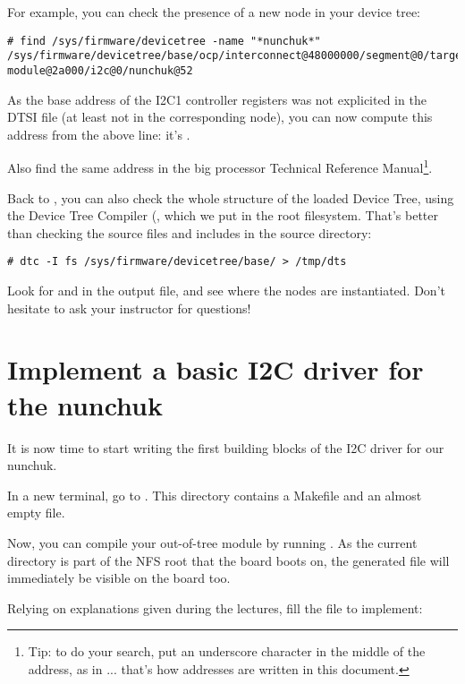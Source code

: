 For example, you can check the presence of a new  node in
your device tree:

{\small
\begin{verbatim}
# find /sys/firmware/devicetree -name "*nunchuk*"
/sys/firmware/devicetree/base/ocp/interconnect@48000000/segment@0/target-module@2a000/i2c@0/nunchuk@52
\end{verbatim}
}

As the base address of the I2C1 controller registers was not explicited
in the DTSI file (at least not in the corresponding node), you can now
compute this address from the above line: it's .

Also find the same address in the big processor Technical Reference
Manual\footnote{Tip: to do your search, put an underscore character
in the middle of the address, as in ... that's how
addresses are written in this document.}.

Back to , you can also check the whole
structure of the loaded Device Tree, using the Device Tree Compiler
(, which we put in the root filesystem. That's better than
checking the source files and includes in the source directory:

\begin{verbatim}
# dtc -I fs /sys/firmware/devicetree/base/ > /tmp/dts
\end{verbatim}

Look for  and  in the output file,
and see where the nodes are instantiated. Don't hesitate to ask your
instructor for questions!

\section{Implement a basic I2C driver for the nunchuk}

It is now time to start writing the first building blocks of the I2C
driver for our nunchuk.

In a new terminal, go to
.  This directory
contains a Makefile and an almost empty  file.

Now, you can compile your out-of-tree module by running . As
the current directory is part of the NFS root that the board boots on,
the generated  file will immediately be visible on the board
too.

Relying on explanations given during the lectures, fill the
 file to implement:


